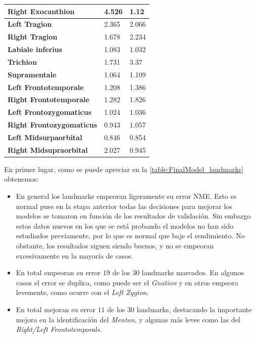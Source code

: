 \begin{table}[!ht]
\begin{tabular}{|l|l|l|}
                \textbf{Right Exocanthion} & 4.526 & \cellcolor{green!25}1.12 \\ \hline
                \textbf{Left Tragion} & 2.365 & \cellcolor{green!25}2.066 \\ \hline
                \textbf{Right Tragion} & \cellcolor{green!25}1.678 & 2.234 \\ \hline
                \textbf{Labiale inferius} & 1.083 & \cellcolor{green!25}1.032 \\ \hline
                \textbf{Trichion} & \cellcolor{green!25}1.731 & 3.37 \\ \hline
                \textbf{Supramentale} & \cellcolor{green!25}1.064 & 1.109 \\ \hline
                \textbf{Left Frontotemporale} & \cellcolor{green!25}1.208 & 1.386 \\ \hline
                \textbf{Right Frontotemporale} & \cellcolor{green!25}1.282 & 1.826 \\ \hline
                \textbf{Left Frontozygomaticus} & \cellcolor{green!25}1.024 & 1.036 \\ \hline
                \textbf{Right Frontozygomaticus} & \cellcolor{green!25}0.943 & 1.057 \\ \hline
                \textbf{Left Midsurpaorbital} & \cellcolor{green!25}0.846 & 0.854 \\ \hline
                \textbf{Right Midsupraorbital} & 2.027 & \cellcolor{green!25}0.945 \\ \hline
            \end{tabular}
            \label{table:FinalModel_landmarks}
        \end{table}
        
        \medskip

        \noindent En primer lugar, como se puede apreciar en la \autoref{table:FinalModel_landmarks} obtenemos: 

        \begin{itemize}
            \item En general los landmarks empeoran ligeramente su error NME. Esto es normal pues en la etapa anterior todas las decisiones para mejorar los modelos se tomaron en función de los resultados de validación. Sin embargo estos datos nuevos en los que se está probando el modelos no han sido estudiados previamente, por lo que es normal que baje el rendimiento. No obstante, los resultados siguen siendo buenos, y no se empeoran excesivamente en la mayoría de casos. 
            \item En total empeoran su error $19$ de los $30$ landmarks marcados. En algunos casos el error se duplica, como puede ser el \textit{Gnation} y en otros empeora levemente, como ocurre con el \textit{Left Zygion}. 
            \item En total mejoran su error $11$ de los $30$ landmarks, destacando la importante mejora en la identificación del \textit{Menton}, y algunas más leves como las del \textit{Right/Left Frontotemporale}.
        \end{itemize}

